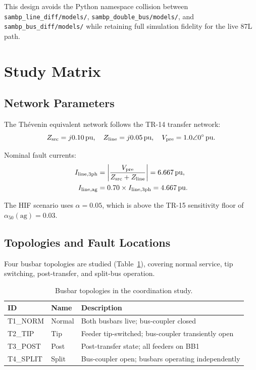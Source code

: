 \documentclass[11pt, a4paper]{article}
\begin{document}
This design avoids the Python namespace collision between
\texttt{sambp\_line\_diff/models/}, \texttt{sambp\_double\_bus/models/},
and \texttt{sambp\_bus\_diff/models/} while retaining full simulation
fidelity for the live 87L path.


\section{Study Matrix}
\label{sec:matrix}

\subsection{Network Parameters}

The Thévenin equivalent network follows the TR-14 transfer network:
\begin{equation}
  Z_{\rm src} = j0.10\,\text{pu}, \quad
  Z_{\rm line} = j0.05\,\text{pu}, \quad
  V_{\rm pre} = 1.0\angle 0^\circ\,\text{pu}.
\end{equation}

Nominal fault currents:
\begin{align}
  I_{\rm line,3ph} &= \left|\frac{V_{\rm pre}}{Z_{\rm src}+Z_{\rm line}}\right|
                    = 6.667\,\text{pu}, \\
  I_{\rm line,ag}  &= 0.70 \times I_{\rm line,3ph} = 4.667\,\text{pu}.
\end{align}

The HIF scenario uses $\alpha=0.05$, which is above the TR-15 sensitivity
floor of $\alpha_{50}(\text{ag})=0.03$.

\subsection{Topologies and Fault Locations}

Four busbar topologies are studied (Table~\ref{tab:topos}), covering normal
service, tip switching, post-transfer, and split-bus operation.

\begin{table}[h]
  \centering
  \caption{Busbar topologies in the coordination study.}
  \label{tab:topos}
  \begin{tabular}{llp{7.5cm}}
    \toprule
    ID & Name & Description \\
    \midrule
    T1\_NORM  & Normal   & Both busbars live; bus-coupler closed \\
    T2\_TIP   & Tip      & Feeder tip-switched; bus-coupler transiently open \\
    T3\_POST  & Post     & Post-transfer state; all feeders on BB1 \\
    T4\_SPLIT & Split    & Bus-coupler open; busbars operating independently \\
    \bottomrule
  \end{tabular}
\end{table}
\end{document}
